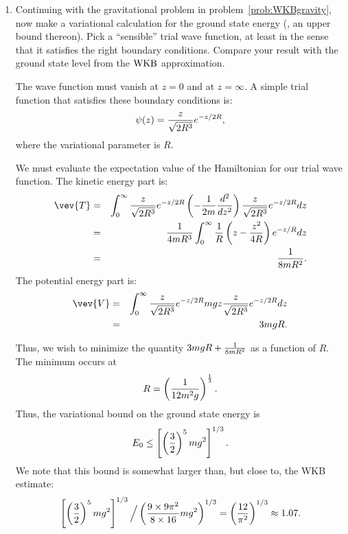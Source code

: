 \begin{enumerate}
\begin{enumerate}
\fi

\end{enumerate}

\item Continuing with the gravitational problem in problem~\ref{prob:WKBgravity}, now make a variational calculation for the ground state energy
(\ie, an upper bound thereon).  Pick a ``sensible'' trial wave function, at
least in the sense that it satisfies the right boundary conditions.  Compare
your result with the ground state level from the ${\rm WKB}$ approximation.

\ifsolve {} The wave function must vanish at $z=0$ and at $z=\infty$. A simple trial function that satisfies these boundary conditions is:
\begin{equation}
 \psi(z) = {z\over\sqrt{2R^3}} e^{-z/2R},
\end{equation}
where the variational parameter is $R$. 

We must evaluate the expectation value of the Hamiltonian for our trial wave function. The kinetic energy part is:
\begin{eqnarray}
 \vev{T} &=& \int_0^\infty {z\over \sqrt{2R^3}}e^{-z/2R}\left(-{1\over 2m}{d^2\over dz^2}\right) {z\over \sqrt{2R^3}}e^{-z/2R} dz \\
  &=& {1\over 4mR^3} \int_0^\infty {1\over R}\left(z-{z^2\over 4R}\right) e^{-z/R} dz \\
  &=& {1\over 8mR^2}.
\end{eqnarray}
The potential energy part is:
\begin{eqnarray}
 \vev{V} &=& \int_0^\infty {z\over \sqrt{2R^3}}e^{-z/2R} mgz {z\over \sqrt{2R^3}}e^{-z/2R} dz \\
   &=& 3mgR.
\end{eqnarray}

Thus, we wish to minimize the quantity $3mgR+{1\over 8mR^2}$ as a function of $R$. The minimum occurs at 
\begin{equation}
 R=\left({1\over 12m^2g}\right)^{1\over 3}.
\end{equation}
Thus, the variational bound on the ground state energy is
\begin{equation}
 E_0 \le \left[\left({3\over 2}\right)^5 mg^2\right]^{1/3}.
\end{equation}
We note that this bound is somewhat larger than, but close to, the WKB estimate:
\begin{equation}
 \left[\left({3\over 2}\right)^5mg^2\right]^{1/3}\Big/\left({9\times9\pi^2\over 8\times 16}mg^2\right)^{1/3} = \left({12\over \pi^2}\right)^{1/3}\approx 1.07.
\end{equation}


\end{enumerate}
